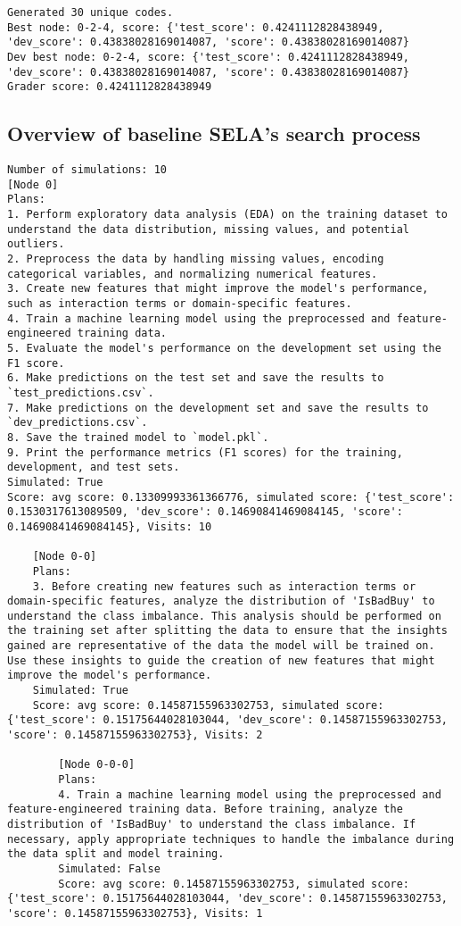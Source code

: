 \begin{lstlisting}[style=txtfile]
Generated 30 unique codes.
Best node: 0-2-4, score: {'test_score': 0.4241112828438949, 'dev_score': 0.43838028169014087, 'score': 0.43838028169014087}
Dev best node: 0-2-4, score: {'test_score': 0.4241112828438949, 'dev_score': 0.43838028169014087, 'score': 0.43838028169014087}
Grader score: 0.4241112828438949
\end{lstlisting}

\subsection{Overview of baseline SELA's search process}

\begin{lstlisting}[style=txtfile]
Number of simulations: 10
[Node 0]
Plans: 
1. Perform exploratory data analysis (EDA) on the training dataset to understand the data distribution, missing values, and potential outliers.
2. Preprocess the data by handling missing values, encoding categorical variables, and normalizing numerical features.
3. Create new features that might improve the model's performance, such as interaction terms or domain-specific features.
4. Train a machine learning model using the preprocessed and feature-engineered training data.
5. Evaluate the model's performance on the development set using the F1 score.
6. Make predictions on the test set and save the results to `test_predictions.csv`.
7. Make predictions on the development set and save the results to `dev_predictions.csv`.
8. Save the trained model to `model.pkl`.
9. Print the performance metrics (F1 scores) for the training, development, and test sets.
Simulated: True
Score: avg score: 0.13309993361366776, simulated score: {'test_score': 0.1530317613089509, 'dev_score': 0.14690841469084145, 'score': 0.14690841469084145}, Visits: 10

	[Node 0-0]
	Plans: 
	3. Before creating new features such as interaction terms or domain-specific features, analyze the distribution of 'IsBadBuy' to understand the class imbalance. This analysis should be performed on the training set after splitting the data to ensure that the insights gained are representative of the data the model will be trained on. Use these insights to guide the creation of new features that might improve the model's performance.
	Simulated: True
	Score: avg score: 0.14587155963302753, simulated score: {'test_score': 0.15175644028103044, 'dev_score': 0.14587155963302753, 'score': 0.14587155963302753}, Visits: 2

		[Node 0-0-0]
		Plans: 
		4. Train a machine learning model using the preprocessed and feature-engineered training data. Before training, analyze the distribution of 'IsBadBuy' to understand the class imbalance. If necessary, apply appropriate techniques to handle the imbalance during the data split and model training.
		Simulated: False
		Score: avg score: 0.14587155963302753, simulated score: {'test_score': 0.15175644028103044, 'dev_score': 0.14587155963302753, 'score': 0.14587155963302753}, Visits: 1


\end{lstlisting}
